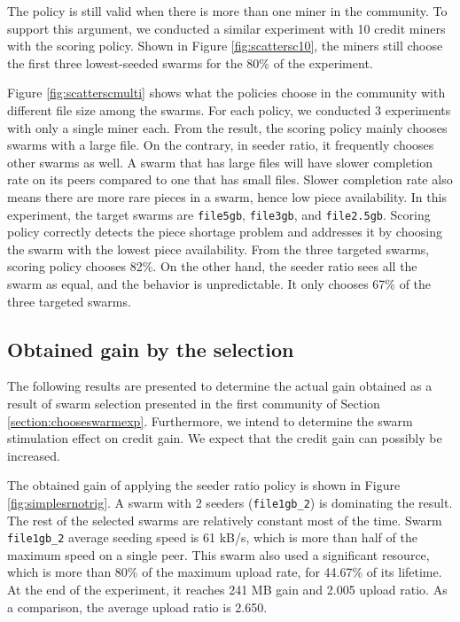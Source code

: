 The policy is still valid when there is more than one miner in the community. To support this argument, we conducted a similar experiment with 10 credit miners with the scoring policy. Shown in Figure \ref{fig:scattersc10}, the miners still choose the first three lowest-seeded swarms for the 80\% of the experiment. 

Figure \ref{fig:scatterscmulti} shows what the policies choose in the community with different file size among the swarms. For each policy, we conducted 3 experiments with only a single miner each. From the result, the scoring policy mainly chooses swarms with a large file. On the contrary, in seeder ratio, it frequently chooses other swarms as well. A swarm that has large files will have slower completion rate on its peers compared to one that has small files. Slower completion rate also means there are more rare pieces in a swarm, hence low piece availability. In this experiment, the target swarms are \texttt{file5gb}, \texttt{file3gb}, and \texttt{file2.5gb}. Scoring policy correctly detects the piece shortage problem and addresses it by choosing the swarm with the lowest piece availability. From the three targeted swarms, scoring policy chooses 82\%. On the other hand, the seeder ratio sees all the swarm as equal, and the behavior is unpredictable. It only chooses 67\% of the three targeted swarms.

\subsection{Obtained gain by the selection}
\label{section:resultgain}
The following results are presented to determine the actual gain obtained as a result of swarm selection presented in the first community of Section \ref{section:chooseswarmexp}. Furthermore, we intend to determine the swarm stimulation effect on credit gain. We expect that the credit gain can possibly be increased.


The obtained gain of applying the seeder ratio policy is shown in Figure \ref{fig:simplesrnotrig}. A swarm with 2 seeders (\texttt{file1gb\_2}) is dominating the result. The rest of the selected swarms are relatively constant most of the time. Swarm \texttt{file1gb\_2} average seeding speed is 61 kB/s, which is more than half of the maximum speed on a single peer. This swarm also used a significant resource, which is more than 80\% of the maximum upload rate, for 44.67\% of its lifetime. At the end of the experiment, it reaches 241 MB gain and 2.005 upload ratio. As a comparison, the average upload ratio is 2.650.

